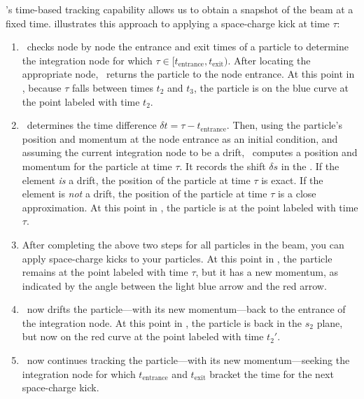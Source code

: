 %
\PTC's time-based tracking capability allows us to obtain a
snapshot of the beam at a fixed time. 
illustrates this approach to applying a space-charge kick at
time $\tau$:
\begin{enumerate}
  \item \PTC\ checks node by node the entrance and exit times
of a particle to determine the integration node for which
$\tau \in [t_\text{entrance},t_\text{exit})$. After locating
the appropriate node, \PTC\ returns the particle to the node
entrance. At this point in , because $\tau$ falls
between times $t_2$ and $t_3$, the particle is on the blue curve
at the point labeled with time $t_2$.
  \item \PTC\ determines the time difference
$\delta t = \tau - t_\text{entrance}$. Then, using the particle's
position and momentum at the node entrance as an initial condition,
and assuming the current integration node to be a drift,
\PTC\ computes a position and momentum for the particle at time $\tau$.
It records the shift $\delta s$ in the .
If the element \emph{is} a drift, the position of the particle at
time $\tau$ is exact. If the element is \emph{not} a drift, the
position of the particle at time $\tau$ is a close approximation.
At this point in , the particle is at the point
labeled with time $\tau$.
  \item After completing the above two steps for all particles in
the beam, you can apply space-charge kicks to your particles. At
this point in , the particle remains at the point
labeled with time $\tau$, but it has a new momentum, as indicated
by the angle between the light blue arrow and the red arrow.
  \item \PTC\ now drifts the particle---with its new momentum---back
to the entrance of the integration node. At this point in
, the particle is back in the $s_2$ plane, but now
on the red curve at the point labeled with time $t_2'$.
  \item \PTC\ now continues tracking the particle---with its new momentum---seeking the integration node for which $t_\text{entrance}$ and $t_\text{exit}$ bracket the time for the next space-charge kick.
\end{enumerate}

\endinput
